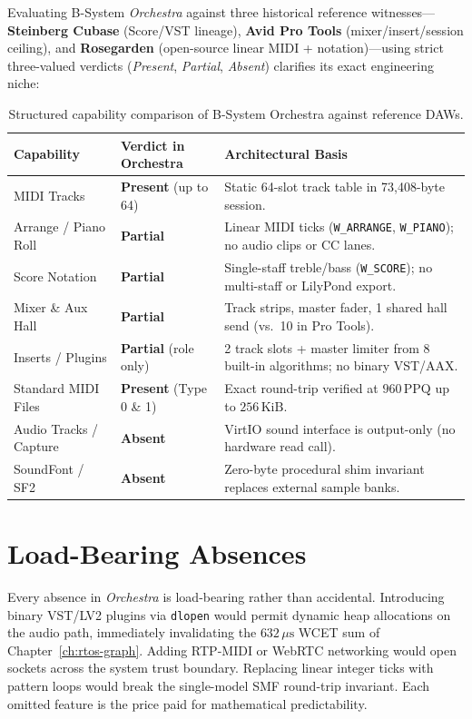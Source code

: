 Evaluating B-System \emph{Orchestra} against three historical reference witnesses—\textbf{Steinberg Cubase} (Score/VST lineage), \textbf{Avid Pro Tools} (mixer/insert/session ceiling), and \textbf{Rosegarden} (open-source linear MIDI + notation)—using strict three-valued verdicts (\emph{Present}, \emph{Partial}, \emph{Absent}) clarifies its exact engineering niche:

\begin{table}[htbp]
\centering
\caption{Structured capability comparison of B-System Orchestra against reference DAWs.}
\small
\begin{tabular}{@{}lp{3.4cm}p{5.8cm}@{}}
\toprule
Capability & Verdict in Orchestra & Architectural Basis \\
\midrule
MIDI Tracks & \textbf{Present} (up to 64) & Static 64-slot track table in 73,408-byte session. \\
Arrange / Piano Roll & \textbf{Partial} & Linear MIDI ticks (\texttt{W\_ARRANGE}, \texttt{W\_PIANO}); no audio clips or CC lanes. \\
Score Notation & \textbf{Partial} & Single-staff treble/bass (\texttt{W\_SCORE}); no multi-staff or LilyPond export. \\
Mixer \& Aux Hall & \textbf{Partial} & Track strips, master fader, 1 shared hall send (vs.\ 10 in Pro Tools). \\
Inserts / Plugins & \textbf{Partial} (role only) & 2 track slots + master limiter from 8 built-in algorithms; no binary VST/AAX. \\
Standard MIDI Files & \textbf{Present} (Type 0 \& 1) & Exact round-trip verified at $960\,\mathrm{PPQ}$ up to $256\,\text{KiB}$. \\
Audio Tracks / Capture & \textbf{Absent} & VirtIO sound interface is output-only (no hardware read call). \\
SoundFont / SF2 & \textbf{Absent} & Zero-byte procedural shim invariant replaces external sample banks. \\
\bottomrule
\end{tabular}
\end{table}

\section{Load-Bearing Absences}

Every absence in \emph{Orchestra} is load-bearing rather than accidental. Introducing binary VST/LV2 plugins via \texttt{dlopen} would permit dynamic heap allocations on the audio path, immediately invalidating the $632\,\mu\text{s}$ WCET sum of Chapter~\ref{ch:rtos-graph}. Adding RTP-MIDI or WebRTC networking would open sockets across the system trust boundary. Replacing linear integer ticks with pattern loops would break the single-model SMF round-trip invariant. Each omitted feature is the price paid for mathematical predictability.

